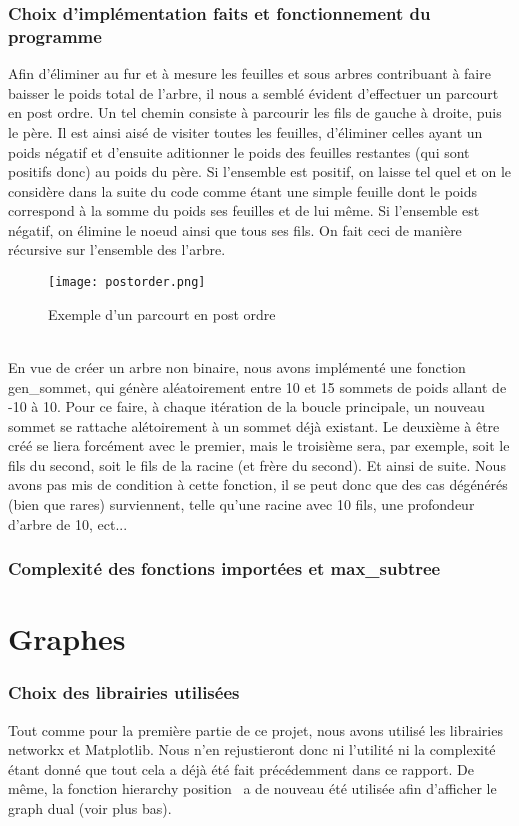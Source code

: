 \documentclass[a4paper]{report}
\begin{document}
\section{Choix d'implémentation faits et fonctionnement du programme}
Afin d'éliminer au fur et à mesure les feuilles et sous arbres contribuant à faire baisser le poids total de l'arbre, il nous a semblé évident d'effectuer un parcourt en post ordre. Un tel chemin consiste à parcourir les fils de gauche à droite, puis le père. Il est ainsi aisé de visiter toutes les feuilles, d'éliminer celles ayant un poids négatif et d'ensuite aditionner le poids des feuilles restantes (qui sont positifs donc) au poids du père. Si l'ensemble est positif, on laisse tel quel et on le considère dans la suite du code comme étant une simple feuille dont le poids correspond à la somme du poids ses feuilles et de lui même. Si l'ensemble est négatif, on élimine le noeud ainsi que tous ses fils. On fait ceci de manière récursive sur l'ensemble des l'arbre.
\begin{figure}[!h]
\begin{center}
\texttt{[image: postorder.png]}
\caption{Exemple d'un parcourt en post ordre \cite{postorder}}
\end{center}
\end{figure}
\\En vue de créer un arbre non binaire, nous avons implémenté une fonction gen\_sommet, qui génère aléatoirement entre 10 et 15 sommets de poids allant de -10 à 10. Pour ce faire, à chaque itération de la boucle principale, un nouveau sommet se rattache alétoirement à un sommet déjà existant. Le deuxième à être créé se liera forcément avec le premier, mais le troisième sera, par exemple, soit le fils du second, soit le fils de la racine (et frère du second). Et ainsi de suite. Nous avons pas mis de condition à cette fonction, il se peut donc que des cas dégénérés (bien que rares) surviennent, telle qu'une racine avec 10 fils, une profondeur d'arbre de 10, ect...
\section{Complexité des fonctions importées et max\_subtree}
\part{Graphes}
\section{Choix des librairies utilisées}
Tout comme pour la première partie de ce projet, nous avons utilisé les librairies networkx et Matplotlib. Nous n'en rejustieront donc ni l'utilité ni la complexité étant donné que tout cela a déjà été fait précédemment dans ce rapport. De même, la fonction \guillemotleft hierarchy position \cite{hierarchypos}\guillemotright~a de nouveau été utilisée afin d'afficher le graph dual (voir plus bas).
\end{document}
